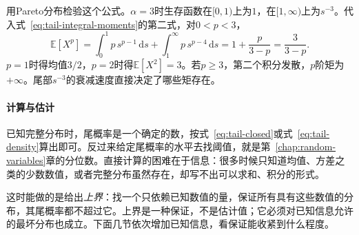 用Pareto分布检验这个公式。$\alpha=3$时生存函数在$[0,1)$上为$1$，在$[1,\infty)$上为$s^{-3}$。代入式~\eqref{eq:tail-integral-moments}的第二式，对$0<p<3$，
\[
 \mathbb{E}[X^p]=\int_0^1p\,s^{p-1}\,\mathrm{d}s+\int_1^{\infty}p\,s^{p-4}\,\mathrm{d}s=1+\frac{p}{3-p}=\frac{3}{3-p} .
\]
$p=1$时得均值$3/2$，$p=2$时得$\mathbb{E}[X^2]=3$。若$p\geq3$，第二个积分发散，$p$阶矩为$+\infty$。尾部$s^{-3}$的衰减速度直接决定了哪些矩存在。

\paragraph{计算与估计}
已知完整分布时，尾概率是一个确定的数，按式~\eqref{eq:tail-closed}或式~\eqref{eq:tail-density}算出即可。反过来给定尾概率的水平去找阈值，就是第~\ref{chap:random-variables}章的分位数。直接计算的困难在于信息：很多时候只知道均值、方差之类的少数数值，或者完整分布虽然存在，却写不出可以求和、积分的形式。

这时能做的是给出\emph{上界}：找一个只依赖已知数值的量，保证所有具有这些数值的分布，其尾概率都不超过它。上界是一种保证，不是估计值；它必须对已知信息允许的最坏分布也成立。下面几节依次增加已知信息，看保证能收紧到什么程度。
